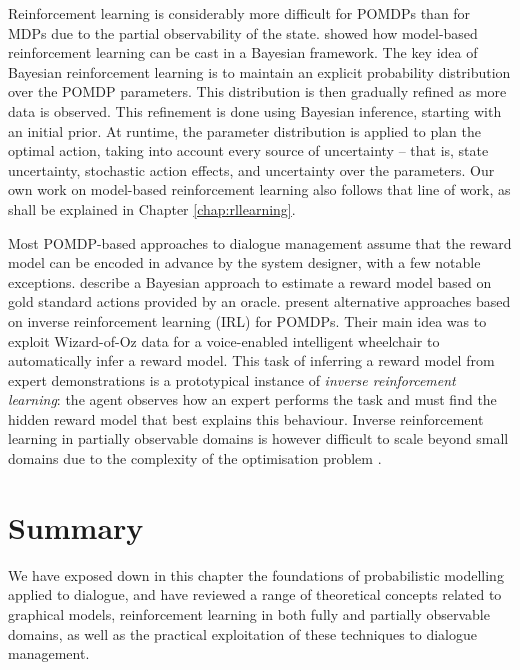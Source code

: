 Reinforcement learning is considerably more difficult for POMDPs than for MDPs due to the partial observability of the state.  \cite{5946754} showed how model-based reinforcement learning can be cast in a Bayesian framework. The key idea of Bayesian reinforcement learning is to maintain an explicit probability distribution over the POMDP parameters. This distribution is then gradually refined as more data is observed. This refinement is done using Bayesian inference, starting with an initial prior.  At runtime, the parameter distribution is applied to plan the optimal action, taking into account every source of uncertainty -- that is, state uncertainty, stochastic action effects, and uncertainty over the parameters.  Our own work on model-based reinforcement learning also follows that line of work, as shall be explained in Chapter \ref{chap:rllearning}. 

Most POMDP-based approaches to dialogue management assume that the reward model can be encoded in advance by the system designer, with a few notable exceptions. \cite{DBLP:conf/iui/AtrashP09} describe a Bayesian approach to estimate a reward model based on gold standard actions provided by an oracle. \cite{boularias2010,ChinaeiC12} present alternative approaches based on inverse reinforcement learning (IRL) for POMDPs. Their main idea was to exploit Wizard-of-Oz data for a voice-enabled intelligent wheelchair to automatically infer a reward model.  This task of inferring a reward model from expert demonstrations is a prototypical instance of \textit{inverse reinforcement learning}: the agent observes how an expert performs the task and must find the hidden reward model that best explains this behaviour.  Inverse reinforcement learning in partially observable domains is however difficult to scale beyond small domains due to the complexity of the optimisation problem \citep{Choi:2011}. 

\section{Summary}

We have exposed down in this chapter the foundations of probabilistic modelling applied to dialogue, and have reviewed a range of theoretical concepts related to graphical models, reinforcement learning in both fully and partially observable domains, as well as the practical exploitation of these techniques to dialogue management. 

